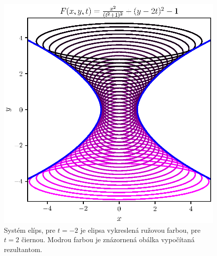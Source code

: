 \begin{figure}[h]
	\centering
	\includegraphics{images/resultant.eps}
	\caption[Obálka nájdená pomocou rezultantu.]{Systém elíps, pre $t=-2$ je elipsa vykreslená ružovou farbou, pre $t=2$ čiernou. Modrou farbou je znázornená obálka vypočítaná rezultantom.}
	\label{fig:too_complicated_equations}
\end{figure}

